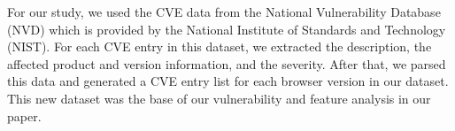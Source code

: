 For our study, we used the CVE data from the National Vulnerability Database
(NVD) which is provided by the National Institute of Standards and Technology (NIST).
For each CVE entry in this dataset, we extracted the description, the affected product and version information, and the severity. After that, we parsed this data and generated a CVE entry list for each browser version in our dataset. This new dataset was the base of our vulnerability and feature analysis in our paper.

